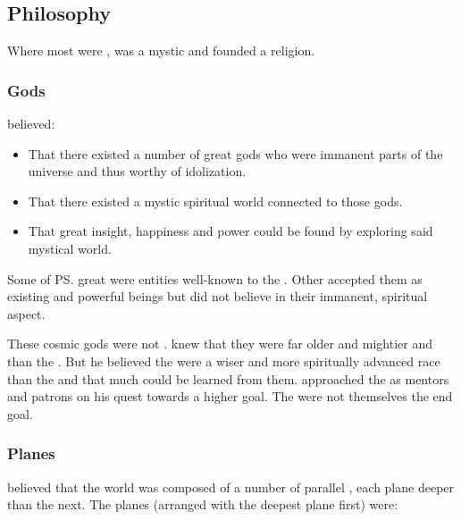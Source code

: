 \subsection{Philosophy}
Where most \ophidians were , \Sethicus was a mystic and founded a religion. 





\subsubsection{Gods}
\Sethicus believed:
\begin{itemize}
  \item 
    That there existed a number of great gods who were immanent parts of the universe and thus worthy of idolization.
  \item 
    That there existed a mystic spiritual world connected to those gods.
  \item
    That great insight, happiness and power could be found by exploring said mystical world.
\end{itemize}

Some of \ps{\Sethicus} great  were entities well-known to the \ophidians.
Other \ophidians accepted them as existing and powerful beings but did not believe in their immanent, spiritual aspect. 

These cosmic gods were not \xss. 
\Sethicus knew that they were far older and mightier and  than the \xss. 
But he believed the \xss were a wiser and more spiritually advanced race than the \ophidians and that much could be learned from them. 
\Sethicus approached the \xss as mentors and patrons on his quest towards a higher goal. 
The \xss were not themselves the end goal. 





\subsubsection{Planes}
\Sethicus believed that the world was composed of a number of parallel , each plane deeper than the next. 
The planes (arranged with the deepest plane first) were:

